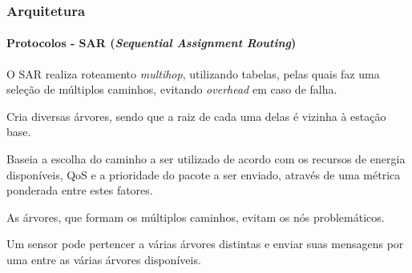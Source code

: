 \documentclass[notes]{beamer}
\begin{document}
\begin{frame}
\label{slide_50}
\frametitle{Arquitetura}
\framesubtitle{Protocolos - SAR (\textit{Sequential Assignment Routing})}

\begin{block}

O SAR realiza roteamento \textit{multihop}, utilizando tabelas, pelas quais faz uma seleção de múltiplos caminhos, evitando \textit{overhead} em caso de falha.

\end{block} \pause

\begin{block}

Cria diversas árvores, sendo que a raiz de cada uma delas é vizinha à estação base. 

\end{block} \pause

\begin{block}

Baseia a escolha do caminho a ser utilizado de acordo com os recursos de energia disponíveis, QoS e a prioridade do pacote a ser enviado, através de uma métrica ponderada entre estes fatores.

\end{block} \pause

\begin{block}

As árvores, que formam os múltiplos caminhos, evitam os nós problemáticos.

\end{block} \pause

\begin{block}

Um sensor pode pertencer a várias árvores distintas e enviar suas mensagens por uma entre as várias árvores disponíveis.

\end{block}

\end{frame}
\end{document}
